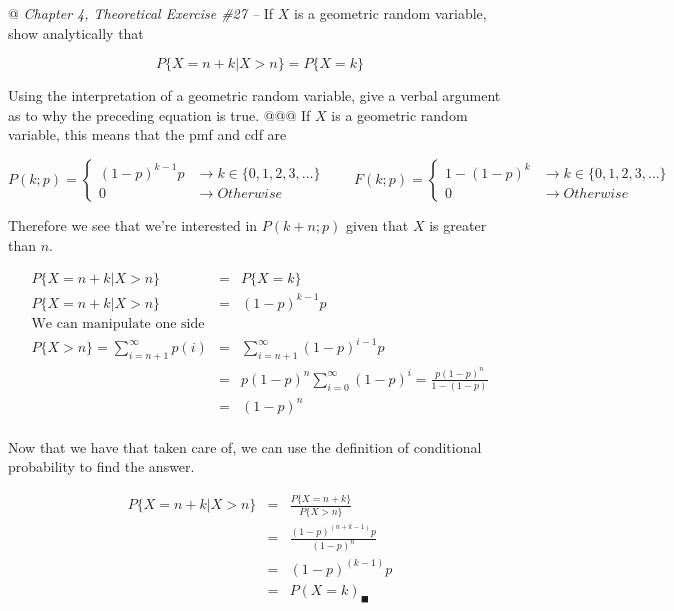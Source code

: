 \documentclass[10pt]{article}
\begin{document}
\begin{easylist}[enumerate]
    @ \textit{Chapter 4, Theoretical Exercise \#27 --} If $X$ is a geometric random variable, show analytically that

    \[ P\{X = n + k|X > n\} = P\{X=k\} \]

    Using the interpretation of a geometric random variable, give a verbal argument as to why the preceding equation is
    true.
    @@@ If $X$ is a geometric random variable, this means that the pmf and cdf are

    \[
        P(k;p) =
        \begin{cases}
            {(1-p)}^{k-1}p &\to k \in \{0, 1, 2, 3, \ldots\}\\
            0 &\to Otherwise
        \end{cases}
        \qquad
        F(k;p) =
        \begin{cases}
            1-{(1-p)}^k &\to k \in \{0, 1, 2, 3, \ldots\}\\
            0 &\to Otherwise
        \end{cases}
    \]

    Therefore we see that we're interested in $P(k+n;p)$ given that $X$ is greater than $n$.

    \[
        \begin{aligned}
            P\{X = n + k|X > n\} &=&  P\{X=k\}\\
            P\{X = n + k|X > n\} &=& {(1-p)}^{k-1}p\\
            \text{We can manipulate one side}\\
            P\{X > n\} = \sum_{i = n+1}^\infty p(i) &=& \sum_{i = n+1}^\infty {(1-p)}^{i - 1}p\\
            &=& p {(1-p)}^n \sum_{i = 0}^\infty {(1-p)}^i = \frac{p {(1-p)}^n}{1-(1-p)}\\
            &=& (1-p)^n\\
        \end{aligned}
    \]

    Now that we have that taken care of, we can use the definition of conditional probability to find the answer.

    \[
        \begin{aligned}
            P\{X = n + k|X > n\} &=&  \frac{P\{X=n+k\} }{P\{X > n\} }\\
            &=& \frac{ {(1-p)}^{(n+k-1)}p}{ {(1-p)}^n}\\
            &=& {(1-p)}^{(k-1)}p\\
            &=& P(X=k)_\blacksquare\\
        \end{aligned}
    \]


\end{easylist}
\end{document}
